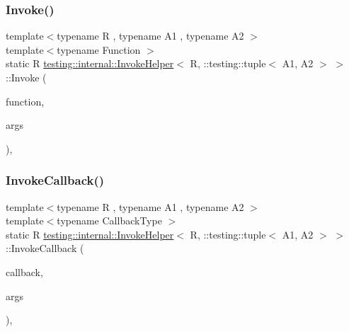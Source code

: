 \subsubsection{\texorpdfstring{Invoke()}{Invoke()}}
{\footnotesize\ttfamily template$<$typename R , typename A1 , typename A2 $>$ \\
template$<$typename Function $>$ \\
static R \mbox{\hyperlink{classtesting_1_1internal_1_1InvokeHelper}{testing\+::internal\+::\+Invoke\+Helper}}$<$ R, \+::testing\+::tuple$<$ A1, A2 $>$ $>$\+::Invoke (\begin{DoxyParamCaption}\item[{\mbox{\hyperlink{structtesting_1_1internal_1_1Function}{Function}}}]{function,  }\item[{const \+::testing\+::tuple$<$ A1, A2 $>$ \&}]{args }\end{DoxyParamCaption})\hspace{0.3cm}{\ttfamily [inline]}, {\ttfamily [static]}}

\mbox{\label{classtesting_1_1internal_1_1InvokeHelper_3_01R_00_01_1_1testing_1_1tuple_3_01A1_00_01A2_01_4_01_4_ac03df8405713ccfd5b91887e701c591b}} 
\subsubsection{\texorpdfstring{InvokeCallback()}{InvokeCallback()}}
{\footnotesize\ttfamily template$<$typename R , typename A1 , typename A2 $>$ \\
template$<$typename Callback\+Type $>$ \\
static R \mbox{\hyperlink{classtesting_1_1internal_1_1InvokeHelper}{testing\+::internal\+::\+Invoke\+Helper}}$<$ R, \+::testing\+::tuple$<$ A1, A2 $>$ $>$\+::Invoke\+Callback (\begin{DoxyParamCaption}\item[{Callback\+Type $\ast$}]{callback,  }\item[{const \+::testing\+::tuple$<$ A1, A2 $>$ \&}]{args }\end{DoxyParamCaption})\hspace{0.3cm}{\ttfamily [inline]}, {\ttfamily [static]}}

